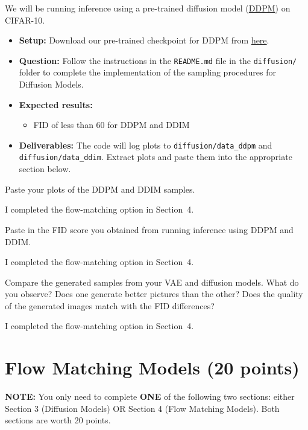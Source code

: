 \documentclass[11pt,addpoints,answers]{exam}
\numberwithin{equation}{section} %
\numberwithin{figure}{section} %
\numberwithin{table}{section} %
\begin{document}
We will be running inference using a pre-trained diffusion model (\href{https://arxiv.org/abs/2006.11239}{DDPM}) on CIFAR-10. 
\begin{itemize}
\item \textbf{Setup:} Download our pre-trained checkpoint for DDPM from \href{https://drive.google.com/file/d/1gtn9Jv9jBUol7iJw-94hw4j6KfpG3SZE/view?usp=sharing}{here}.
\item \textbf{Question:} Follow the instructions in the \texttt{README.md} file in the \texttt{diffusion/} folder to complete the implementation of the sampling procedures for Diffusion Models.
\item \textbf{Expected results:} 
    \begin{itemize}
        \item FID of less than 60 for DDPM and DDIM
    \end{itemize}
\item \textbf{Deliverables:} The code will log plots to \texttt{diffusion/data\_ddpm} and \texttt{diffusion/data\_ddim}. Extract plots and paste them into the appropriate section below. 
\end{itemize}
\begin{questions}
\question Paste your plots of the DDPM and DDIM samples.
\begin{solution}
I completed the flow-matching option in Section~4.
\end{solution}
\question Paste in the FID score you obtained from running inference using DDPM and DDIM.
\begin{solution}
I completed the flow-matching option in Section~4.
\end{solution}
\question Compare the generated samples from your VAE and diffusion models. What do you observe? Does one generate better pictures than the other? Does the quality of the generated images match with the FID differences?
\begin{solution}
I completed the flow-matching option in Section~4.
\end{solution}

\end{questions}

\newpage
\section{Flow Matching Models (20 points)}
\begin{notebox}
\textbf{NOTE:} You only need to complete \textbf{ONE} of the following two sections: either Section 3 (Diffusion Models) OR Section 4 (Flow Matching Models). Both sections are worth 20 points.
\end{notebox}
\end{document}
